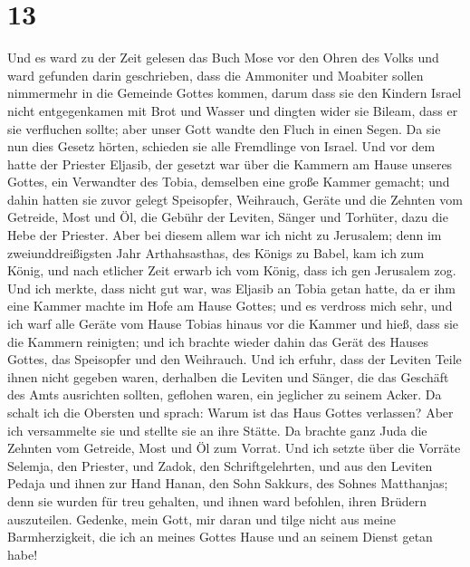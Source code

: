\hypertarget{section-12}{%
\section{13}\label{section-12}}

 Und es ward zu der Zeit gelesen das Buch Mose vor den
Ohren des Volks und ward gefunden darin geschrieben, dass die Ammoniter
und Moabiter sollen nimmermehr in die Gemeinde Gottes kommen,
 darum dass sie den Kindern Israel nicht entgegenkamen mit
Brot und Wasser und dingten wider sie Bileam, dass er sie verfluchen
sollte; aber unser Gott wandte den Fluch in einen Segen. 
Da sie nun dies Gesetz hörten, schieden sie alle Fremdlinge von Israel.
 Und vor dem hatte der Priester Eljasib, der gesetzt war
über die Kammern am Hause unseres Gottes, ein Verwandter des Tobia,
demselben eine große Kammer gemacht;  und dahin hatten sie
zuvor gelegt Speisopfer, Weihrauch, Geräte und die Zehnten vom Getreide,
Most und Öl, die Gebühr der Leviten, Sänger und Torhüter, dazu die Hebe
der Priester.  Aber bei diesem allem war ich nicht zu
Jerusalem; denn im zweiunddreißigsten Jahr Arthahsasthas, des Königs zu
Babel, kam ich zum König, und nach etlicher Zeit erwarb ich vom König,
 dass ich gen Jerusalem zog. Und ich merkte, dass nicht
gut war, was Eljasib an Tobia getan hatte, da er ihm eine Kammer machte
im Hofe am Hause Gottes;  und es verdross mich sehr, und
ich warf alle Geräte vom Hause Tobias hinaus vor die Kammer
 und hieß, dass sie die Kammern reinigten; und ich brachte
wieder dahin das Gerät des Hauses Gottes, das Speisopfer und den
Weihrauch.  Und ich erfuhr, dass der Leviten Teile ihnen
nicht gegeben waren, derhalben die Leviten und Sänger, die das Geschäft
des Amts ausrichten sollten, geflohen waren, ein jeglicher zu seinem
Acker.  Da schalt ich die Obersten und sprach: Warum ist
das Haus Gottes verlassen? Aber ich versammelte sie und stellte sie an
ihre Stätte.  Da brachte ganz Juda die Zehnten vom
Getreide, Most und Öl zum Vorrat.  Und ich setzte über
die Vorräte Selemja, den Priester, und Zadok, den Schriftgelehrten, und
aus den Leviten Pedaja und ihnen zur Hand Hanan, den Sohn Sakkurs, des
Sohnes Matthanjas; denn sie wurden für treu gehalten, und ihnen ward
befohlen, ihren Brüdern auszuteilen.  Gedenke, mein Gott,
mir daran und tilge nicht aus meine Barmherzigkeit, die ich an meines
Gottes Hause und an seinem Dienst getan habe!

